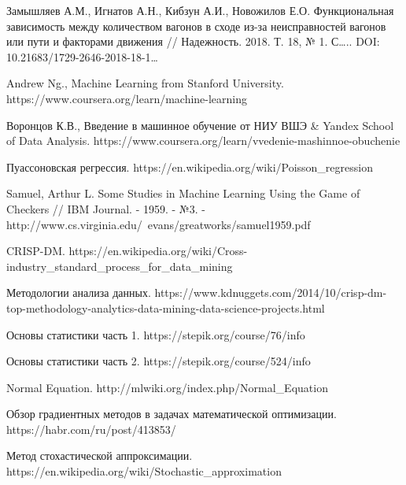 \begin{thebibliography}{00}
    
     Замышляев А.М., Игнатов А.Н., Кибзун А.И., Новожилов Е.О. Функциональная зависимость между количеством вагонов в сходе из-за неисправностей вагонов или пути и факторами движения // Надежность. 2018. Т. 18, № 1. С….. DOI: 10.21683/1729-2646-2018-18-1…
    
     Andrew Ng., Machine Learning from Stanford University. https://www.coursera.org/learn/machine-learning
    
     Воронцов К.В., Введение в машинное обучение от НИУ ВШЭ \& Yandex School of Data Analysis. https://www.coursera.org/learn/vvedenie-mashinnoe-obuchenie
    
     Пуассоновская регрессия. https://en.wikipedia.org/wiki/Poisson\_regression
    
     Samuel, Arthur L. Some Studies in Machine Learning Using the Game of Checkers // IBM Journal. - 1959. - №3. - http://www.cs.virginia.edu/~evans/greatworks/samuel1959.pdf
    
     CRISP-DM. https://en.wikipedia.org/wiki/Cross-industry\_standard\_process\_for\_data\_mining
    
     Методологии анализа данных. https://www.kdnuggets.com/2014/10/crisp-dm-top-methodology-analytics-data-mining-data-science-projects.html
    
     Основы статистики часть 1. https://stepik.org/course/76/info
    
     Основы статистики часть 2. https://stepik.org/course/524/info
    
     Normal Equation. http://mlwiki.org/index.php/Normal\_Equation
    
     Обзор градиентных методов в задачах математической оптимизации. https://habr.com/ru/post/413853/
    
     Метод стохастической аппроксимации. https://en.wikipedia.org/wiki/Stochastic\_approximation
    
\end{thebibliography}
